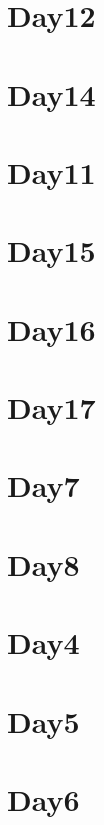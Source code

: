 
\section*{Day12}

\vfill
\section*{Day14}

\vfill
\section*{Day11}

\vfill
\section*{Day15}

\vfill
\section*{Day16}

\vfill
\section*{Day17}

\vfill
\section*{Day7}

\vfill
\section*{Day8}

\vfill
\section*{Day4}

\vfill
\section*{Day5}

\vfill
\section*{Day6}

\vfill
